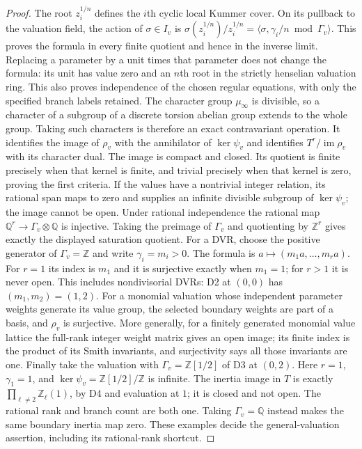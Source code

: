\begin{proof}
The root $z_i^{1/n}$ defines the $i$th cyclic local Kummer cover. On its pullback to the valuation field, the action of $\sigma\in I_v$ is
$\sigma(z_i^{1/n})/z_i^{1/n}=\langle\sigma,\gamma_i/n\bmod\Gamma_v\rangle$.
This proves the formula in every finite quotient and hence in the inverse limit. Replacing a parameter by a unit times that parameter does not change the formula: its unit has value zero and an $n$th root in the strictly henselian valuation ring. This also proves independence of the chosen regular equations, with only the specified branch labels retained.
The character group $\mu_\infty$ is divisible, so a character of a subgroup of a discrete torsion abelian group extends to the whole group. Taking such characters is therefore an exact contravariant operation. It identifies the image of $\rho_v$ with the annihilator of $\ker\psi_v$ and identifies $T^r/\operatorname{im}\rho_v$ with its character dual. The image is compact and closed. Its quotient is finite precisely when that kernel is finite, and trivial precisely when that kernel is zero, proving the first criteria. If the values have a nontrivial integer relation, its rational span maps to zero and supplies an infinite divisible subgroup of $\ker\psi_v$; the image cannot be open. Under rational independence the rational map $\mathbb Q^r\to\Gamma_v\otimes\mathbb Q$ is injective. Taking the preimage of $\Gamma_v$ and quotienting by $\mathbb Z^r$ gives exactly the displayed saturation quotient.
For a DVR, choose the positive generator of $\Gamma_v=\mathbb Z$ and write $\gamma_i=m_i>0$. The formula is $a\mapsto(m_1a,\ldots,m_ra)$. For $r=1$ its index is $m_1$ and it is surjective exactly when $m_1=1$; for $r>1$ it is never open. This includes nondivisorial DVRs: D2 at $(0,0)$ has $(m_1,m_2)=(1,2)$. For a monomial valuation whose independent parameter weights generate its value group, the selected boundary weights are part of a basis, and $\rho_v$ is surjective. More generally, for a finitely generated monomial value lattice the full-rank integer weight matrix gives an open image; its finite index is the product of its Smith invariants, and surjectivity says all those invariants are one.
Finally take the valuation with $\Gamma_v=\mathbb Z[1/2]$ of D3 at $(0,2)$. Here $r=1$, $\gamma_1=1$, and $\ker\psi_v=\mathbb Z[1/2]/\mathbb Z$ is infinite. The inertia image in $T$ is exactly $\prod_{\ell\ne2}\mathbb Z_\ell(1)$, by D4 and evaluation at $1$; it is closed and not open. The rational rank and branch count are both one. Taking $\Gamma_v=\mathbb Q$ instead makes the same boundary inertia map zero. These examples decide the general-valuation assertion, including its rational-rank shortcut.
\end{proof}

